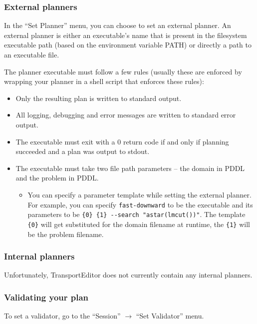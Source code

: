 \subsubsection*{External planners}
In the ``Set Planner'' menu, you can choose to set an external planner. An external planner is either an
executable's name that is present in the filesystem executable path (based on the environment variable PATH)
or directly a path to an executable file.

The planner executable must follow a few rules (usually these are enforced by wrapping your planner in a shell script
that enforces these rules):

\begin{itemize}

\item Only the resulting plan is written to standard output.

\item All logging, debugging and error messages are written to standard error output.

\item The executable must exit with a 0 return code if and only if planning succeeded and a plan was output to stdout.

\item The executable must take two file path parameters -- the domain in PDDL and the problem in PDDL.

\begin{itemize}

\item You can specify a parameter template while setting the external planner. For example, you can specify \texttt{fast-downward}
to be the executable and its parameters to be \verb+{0} {1} --search "astar(lmcut())"+. The template \verb+{0}+ will get
substituted for the domain filename at runtime, the \verb+{1}+ will be the problem filename.

\end{itemize}

\end{itemize}

\subsubsection*{Internal planners}
Unfortunately, TransportEditor does not currently contain any internal planners.

\subsubsection*{Validating your plan}
To set a validator, go to the ``Session'' $\to$ ``Set Validator'' menu.

